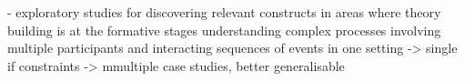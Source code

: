 - exploratory studies for discovering relevant constructs in areas where theory building is at the formative stages
understanding complex processes involving multiple participants and interacting sequences of events in one setting
-> single if constraints -> mmultiple case studies, better generalisable